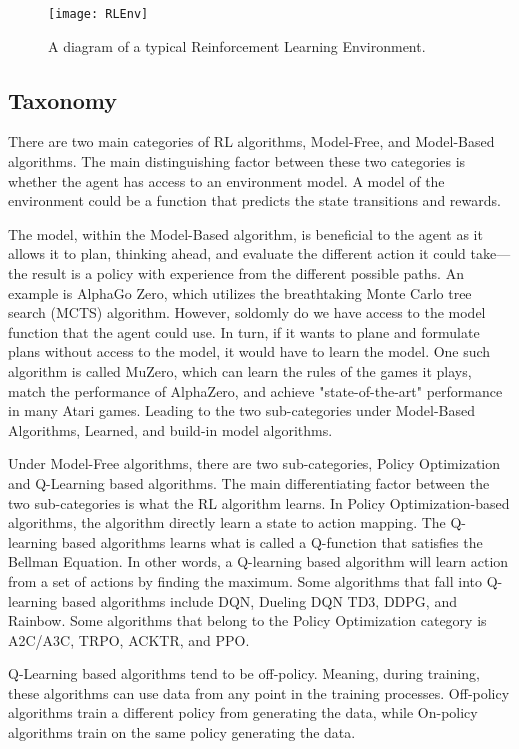 \begin{figure}
	\centering
	\texttt{[image: RLEnv]}
	\caption{A diagram of a typical Reinforcement Learning Environment.}
	\label{fig:RLEnv}
\end{figure}

\subsection{Taxonomy}

There are two main categories of RL algorithms, Model-Free, and Model-Based algorithms. The main distinguishing factor between these two categories is whether the agent has access to an environment model. A model of the environment could be a function that predicts the state transitions and rewards.

The model, within the Model-Based algorithm, is beneficial to the agent as it allows it to plan, thinking ahead, and evaluate the different action it could take—the result is a policy with experience from the different possible paths. An example is AlphaGo Zero, which utilizes the breathtaking Monte Carlo tree search (MCTS) algorithm. However, soldomly do we have access to the model function that the agent could use. In turn, if it wants to plane and formulate plans without access to the model, it would have to learn the model. One such algorithm is called MuZero, which can learn the rules of the games it plays, match the performance of AlphaZero, and achieve "state-of-the-art" performance in many Atari games. Leading to the two sub-categories under Model-Based Algorithms, Learned, and build-in model algorithms.

Under Model-Free algorithms, there are two sub-categories, Policy Optimization and Q-Learning based algorithms. The main differentiating factor between the two sub-categories is what the RL algorithm learns. In Policy Optimization-based algorithms, the algorithm directly learn a state to action mapping. The Q-learning based algorithms learns what is called a Q-function that satisfies the Bellman Equation. In other words, a Q-learning based algorithm will learn action from a set of actions by finding the maximum. Some algorithms that fall into Q-learning based algorithms include DQN, Dueling DQN TD3, DDPG, and Rainbow. Some algorithms that belong to the Policy Optimization category is A2C/A3C, TRPO, ACKTR, and PPO. 

Q-Learning based algorithms tend to be off-policy. Meaning, during training, these algorithms can use data from any point in the training processes. Off-policy algorithms train a different policy from generating the data, while On-policy algorithms train on the same policy generating the data.


